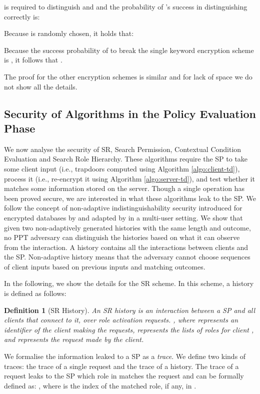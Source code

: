 \documentclass[final,5p,times,twocolumn]{elsarticle}
\newtheorem{definition}{Definition}
\begin{document}
 is required to distinguish  and  and the probability of 's success in distinguishing correctly is:


Because  is randomly chosen, it holds that:
\noindent


Because the success probability of  to break the single keyword encryption scheme is , it follows that .

The proof for the other encryption schemes is similar and for lack of space we do not show all the details.

\subsection{Security of Algorithms in the Policy Evaluation Phase}
We now analyse the security of SR, Search Permission, Contextual Condition Evaluation and Search Role Hierarchy. These algorithms require the SP to take some client input (i.e., trapdoors computed using Algorithm \ref{algo:client-td}), process it (i.e., re-encrypt it using Algorithm \ref{algo:server-td}), and test whether it matches some information stored on the server. Though a single operation has been proved secure, we are interested in what these algorithms leak to the SP. We follow the concept of non-adaptive indistinguishability security introduced for encrypted databases by \cite{Curtmola2006} and adapted by \cite{Dong2011} in a multi-user setting. We show that given two non-adaptively generated histories with the same length and outcome, no PPT adversary can distinguish the histories based on what it can observe from the interaction. A history contains all the interactions between clients and the SP. Non-adaptive history means that the adversary cannot choose sequences of client inputs based on previous inputs and matching outcomes.

In the following, we show the details for the SR scheme. In this scheme, a history is defined as follows:

\begin{definition}[SR History]
An SR history  is an interaction between a SP and all clients that connect to it, over  role activation requests. , where  represents an identifier of the client making the requests,  represents the lists of roles for client , and  represents the request made by the client.
\end{definition}

We formalise the information leaked to a SP as a \textit{trace}. We define two kinds of traces: the trace of a single request and the trace of a history. The trace of a request leaks to the SP which role in  matches the request and can be formally defined as: , where  is the index of the matched role, if any, in .
\end{document}
